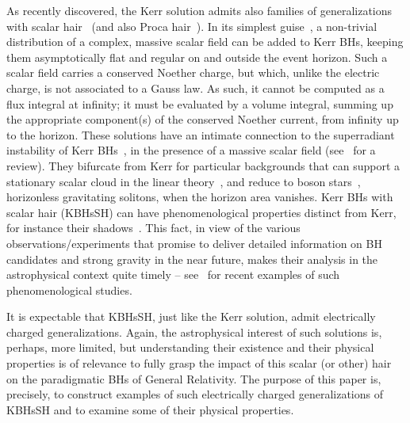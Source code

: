 \documentclass{article}
\begin{document}
As recently discovered, the Kerr solution admits also families of generalizations with scalar hair~\cite{Herdeiro:2014goa,Herdeiro:2015gia,Kleihaus:2015iea,Herdeiro:2015tia,Chodosh:2015oma} (and also Proca hair~\cite{Herdeiro:2016tmi}). In its simplest guise~\cite{Herdeiro:2014goa,Herdeiro:2015gia}, a non-trivial distribution of a complex, massive scalar field can be added to Kerr BHs, keeping them asymptotically flat and regular on and outside the event horizon. Such a scalar field carries a conserved Noether charge, but which, unlike the electric charge, is not associated to a Gauss law. As such, it cannot be computed as a flux integral at infinity; it must be evaluated by a volume integral, summing up the appropriate component(s) of the conserved Noether current, from infinity up to the horizon. These solutions have an intimate connection to the superradiant instability of Kerr BHs~\cite{Herdeiro:2014ima}, in the presence of a massive scalar field (see~\cite{Brito:2015oca} for a review). They bifurcate from Kerr for particular backgrounds that can support a stationary scalar cloud in the linear theory~\cite{Hod:2012px,Hod:2013zza,Herdeiro:2014goa,Benone:2014ssa,Hod:2015ota,Hod:2015goa}, and reduce to boson stars~\cite{Schunck:2003kk}, horizonless gravitating solitons, when the horizon area vanishes. Kerr BHs with scalar hair (KBHsSH) can have phenomenological properties distinct from Kerr, for instance their shadows~\cite{Cunha:2015yba}. This fact, in view of the various observations/experiments that promise to deliver detailed information on BH candidates and strong gravity in the near future, makes their analysis in the astrophysical context quite timely -- see~\cite{Vincent:2016sjq,Ni:2016rhz} for recent examples of such phenomenological studies.

\bigskip

It is expectable that KBHsSH, just like the Kerr solution, admit electrically charged generalizations. Again, the astrophysical interest of such solutions is, perhaps, more limited, but understanding their existence and their physical properties is of relevance to fully grasp the impact of this scalar (or other) hair on the paradigmatic BHs of General Relativity. The purpose of this paper is, precisely, to construct examples of such electrically charged generalizations of KBHsSH and to examine some of their physical properties. 

\bigskip
\end{document}
